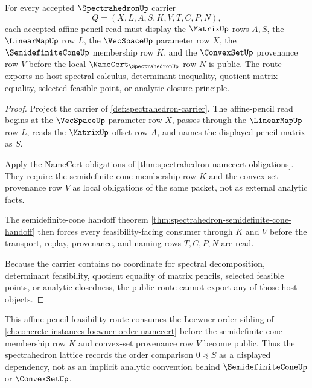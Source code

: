 \begin{theorem}
\label{thm:spectrahedron-semidefinite-cone-route}
For every accepted $\SpectrahedronUp$ carrier
$$
Q=(X,L,A,S,K,V,T,C,P,N),
$$
each accepted affine-pencil read must display the $\MatrixUp$ rows $A,S$, the $\LinearMapUp$ row $L$, the $\VecSpaceUp$ parameter row $X$, the $\SemidefiniteConeUp$ membership row $K$, and the $\ConvexSetUp$ provenance row $V$ before the local $\NameCert_{\SpectrahedronUp}$ row $N$ is public. The route exports no host spectral calculus, determinant inequality, quotient matrix equality, selected feasible point, or analytic closure principle.
\end{theorem}
\begin{proof}
Project the carrier of \autoref{def:spectrahedron-carrier}. The affine-pencil read begins at the $\VecSpaceUp$ parameter row $X$, passes through the $\LinearMapUp$ row $L$, reads the $\MatrixUp$ offset row $A$, and names the displayed pencil matrix as $S$.

Apply the NameCert obligations of \autoref{thm:spectrahedron-namecert-obligations}. They require the semidefinite-cone membership row $K$ and the convex-set provenance row $V$ as local obligations of the same packet, not as external analytic facts.

The semidefinite-cone handoff theorem \autoref{thm:spectrahedron-semidefinite-cone-handoff} then forces every feasibility-facing consumer through $K$ and $V$ before the transport, replay, provenance, and naming rows $T,C,P,N$ are read.

Because the carrier contains no coordinate for spectral decomposition, determinant feasibility, quotient equality of matrix pencils, selected feasible points, or analytic closedness, the public route cannot export any of those host objects.
\end{proof}

This affine-pencil feasibility route consumes the Loewner-order sibling of \autoref{ch:concrete-instances-loewner-order-namecert} before the semidefinite-cone membership row $K$ and convex-set provenance row $V$ become public. Thus the spectrahedron lattice records the order comparison $0 \preceq S$ as a displayed dependency, not as an implicit analytic convention behind $\SemidefiniteConeUp$ or $\ConvexSetUp$.


